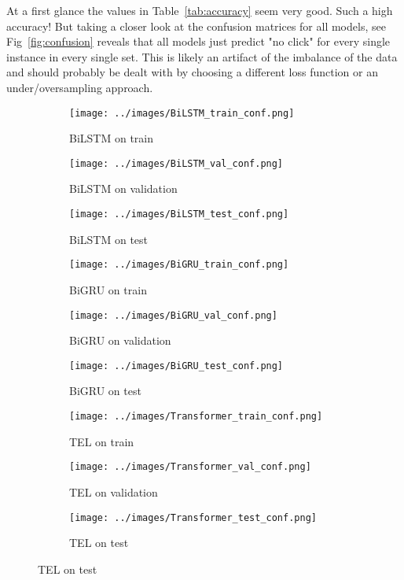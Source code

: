 \documentclass[utf8x]{ctexart}
\begin{document}
At a first glance the values in Table~\ref{tab:accuracy} seem very good. Such a high accuracy! But taking a closer look at the confusion matrices for all models, see Fig~\ref{fig:confusion} reveals that all models just predict "no click" for every single instance in every single set. This is likely an artifact of the imbalance of the data and should probably be dealt with by choosing a different loss function or an under/oversampling approach.


\begin{figure}[htb]
  \centering
  \begin{subfigure}[b]{0.32\textwidth}
    \centering
    \texttt{[image: ../images/BiLSTM\_train\_conf.png]}
    \caption{BiLSTM on train}
    \label{fig:BiLSTM_confusion_train}
  \end{subfigure}
  \begin{subfigure}[b]{0.32\textwidth}
    \centering
    \texttt{[image: ../images/BiLSTM\_val\_conf.png]}
    \caption{BiLSTM on validation}
    \label{fig:BiLSTM_confusion_val}
  \end{subfigure}
  \begin{subfigure}[b]{0.32\textwidth}
    \centering
    \texttt{[image: ../images/BiLSTM\_test\_conf.png]}
    \caption{BiLSTM on test}
    \label{fig:BiLSTM_confusion_test}
  \end{subfigure}


  \begin{subfigure}[b]{0.32\textwidth}
    \centering
    \texttt{[image: ../images/BiGRU\_train\_conf.png]}
    \caption{BiGRU on train}
    \label{fig:BiGRU_confusion_train}
  \end{subfigure}
  \begin{subfigure}[b]{0.32\textwidth}
    \centering
    \texttt{[image: ../images/BiGRU\_val\_conf.png]}
    \caption{BiGRU on validation}
    \label{fig:BiGRU_confusion_val}
  \end{subfigure}
  \begin{subfigure}[b]{0.32\textwidth}
    \centering
    \texttt{[image: ../images/BiGRU\_test\_conf.png]}
    \caption{BiGRU on test}
    \label{fig:BiGRU_confusion_test}
  \end{subfigure}


  \begin{subfigure}[b]{0.32\textwidth}
    \centering
    \texttt{[image: ../images/Transformer\_train\_conf.png]}
    \caption{TEL on train}
    \label{fig:Transformer_confusion_train}
  \end{subfigure}
  \begin{subfigure}[b]{0.32\textwidth}
    \centering
    \texttt{[image: ../images/Transformer\_val\_conf.png]}
    \caption{TEL on validation}
    \label{fig:Transformer_confusion_val}
  \end{subfigure}
  \begin{subfigure}[b]{0.32\textwidth}
    \centering
    \texttt{[image: ../images/Transformer\_test\_conf.png]}
    \caption{TEL on test}
    \label{fig:Transformer_confusion_test}
  \end{subfigure}


\end{figure}
\end{document}
